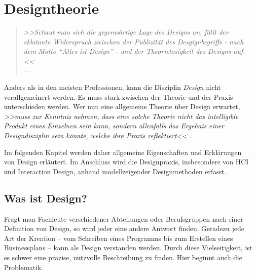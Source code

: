 \chapter{Designtheorie}\label{ch:designTheorie}

\begin{quote}
	\begin{flushright}{\slshape    
	    >>Schaut man sich die gegenwärtige Lage des Designs an, fällt der eklatante Widerspruch zwischen der Publizität des Desgignbegriffs - nach dem Motto ``Alles ist Design'' - und der Theorielosigkeit des Designs auf.<<} \\ \medskip
	    ---  \citep{Bonsiepe:1992}
	\end{flushright}
\end{quote}

Anders als in den meisten Professionen, kann die Disziplin \emph{Design} nicht verallgemeinert werden. Es muss stark zwischen der Theorie und der Praxis unterschieden werden. Wer nun eine allgemeine Theorie über Design erwartet, \emph{>>muss zur Kenntnis nehmen, dass eine solche Theorie nicht das intelligible Produkt eines Einzelnen sein kann, sondern allenfalls das Ergebnis einer Designdisziplin sein könnte, welche ihre Praxis reflektiert<<} \citep{Schneider:2008}.

\medskip Im folgenden Kapitel werden daher allgemeine Eigenschaften und Erklärungen von Design erläutert. Im Anschluss wird die Designpraxis, insbesondere von \ac{HCI} und Interaction Design, anhand modellzeigender Designmethoden erfasst.

\section{Was ist Design?}
Fragt man Fachleute verschiedener Abteilungen oder Berufsgruppen nach einer Definition von Design, so wird jeder eine andere Antwort finden. Geradezu jede Art der Kreation – vom Schreiben eines Programms bis zum Erstellen eines Businessplans – kann als Design verstanden werden. Durch diese Vielseitigkeit, ist es schwer eine präzise, nutzvolle Beschreibung zu finden.  Hier beginnt auch die Problematik. \citep{Sagmeister:2008}

